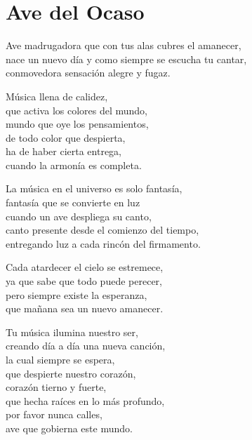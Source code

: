 \section*{Ave del Ocaso}
\label{Ave_del_Ocaso}

\vspace{1em}
\begin{center}
Ave madrugadora que con tus alas cubres el amanecer,\\
nace un nuevo día y como siempre se escucha tu cantar,\\
conmovedora sensación alegre y fugaz.

\vspace{1em}
Música llena de calidez,\\
que activa los colores del mundo,\\
mundo que oye los pensamientos,\\
de todo color que despierta,\\
ha de haber cierta entrega,\\
cuando la armonía es completa.

\vspace{1em}
La música en el universo es solo fantasía,\\
fantasía que se convierte en luz\\
cuando un ave despliega su canto,\\
canto presente desde el comienzo del tiempo,\\
entregando luz a cada rincón del firmamento.

\vspace{1em}
Cada atardecer el cielo se estremece,\\
ya que sabe que todo puede perecer,\\
pero siempre existe la esperanza,\\
que mañana sea un nuevo amanecer.

\vspace{1em}
Tu música ilumina nuestro ser,\\
creando día a día una nueva canción,\\
la cual siempre se espera,\\
que despierte nuestro corazón,\\
corazón tierno y fuerte,\\
que hecha raíces en lo más profundo,\\
por favor nunca calles,\\
ave que gobierna este mundo.

\end{center}




